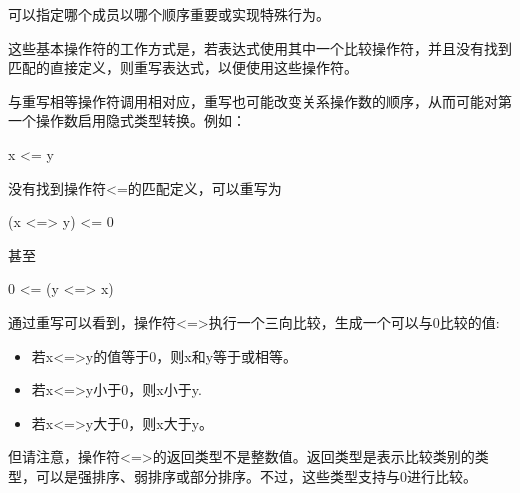 可以指定哪个成员以哪个顺序重要或实现特殊行为。

这些基本操作符的工作方式是，若表达式使用其中一个比较操作符，并且没有找到匹配的直接定义，则重写表达式，以便使用这些操作符。

与重写相等操作符调用相对应，重写也可能改变关系操作数的顺序，从而可能对第一个操作数启用隐式类型转换。例如：

\begin{cpp}
x <= y
\end{cpp}

没有找到操作符<=的匹配定义，可以重写为

\begin{cpp}
(x <=> y) <= 0
\end{cpp}

甚至

\begin{cpp}
0 <= (y <=> x)
\end{cpp}

通过重写可以看到，操作符<=>执行一个三向比较，生成一个可以与0比较的值:

\begin{itemize}
\item
若x<=>y的值等于0，则x和y等于或相等。

\item
若x<=>y小于0，则x小于y.

\item
若x<=>y大于0，则x大于y。
\end{itemize}

但请注意，操作符<=>的返回类型不是整数值。返回类型是表示比较类别的类型，可以是强排序、弱排序或部分排序。不过，这些类型支持与0进行比较。










